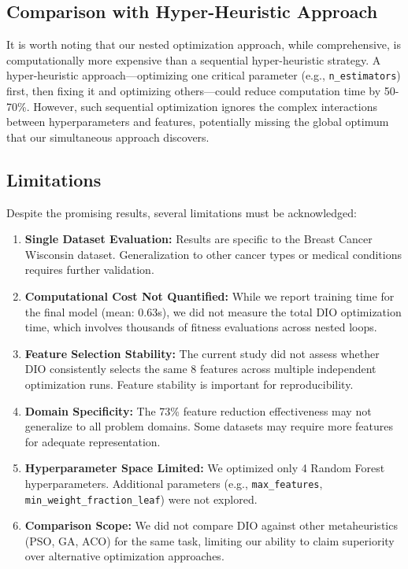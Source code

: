\documentclass[12pt, a4paper]{article}
\begin{document}
\subsection{Comparison with Hyper-Heuristic Approach}
It is worth noting that our nested optimization approach, while comprehensive, is computationally more expensive than a sequential hyper-heuristic strategy. A hyper-heuristic approach—optimizing one critical parameter (e.g., \texttt{n\_estimators}) first, then fixing it and optimizing others—could reduce computation time by 50-70\%. However, such sequential optimization ignores the complex interactions between hyperparameters and features, potentially missing the global optimum that our simultaneous approach discovers.

\subsection{Limitations}
Despite the promising results, several limitations must be acknowledged:
\begin{enumerate}
    \item \textbf{Single Dataset Evaluation:} Results are specific to the Breast Cancer Wisconsin dataset. Generalization to other cancer types or medical conditions requires further validation.
    \item \textbf{Computational Cost Not Quantified:} While we report training time for the final model (mean: 0.63s), we did not measure the total DIO optimization time, which involves thousands of fitness evaluations across nested loops.
    \item \textbf{Feature Selection Stability:} The current study did not assess whether DIO consistently selects the same 8 features across multiple independent optimization runs. Feature stability is important for reproducibility.
    \item \textbf{Domain Specificity:} The 73\% feature reduction effectiveness may not generalize to all problem domains. Some datasets may require more features for adequate representation.
    \item \textbf{Hyperparameter Space Limited:} We optimized only 4 Random Forest hyperparameters. Additional parameters (e.g., \texttt{max\_features}, \texttt{min\_weight\_fraction\_leaf}) were not explored.
    \item \textbf{Comparison Scope:} We did not compare DIO against other metaheuristics (PSO, GA, ACO) for the same task, limiting our ability to claim superiority over alternative optimization approaches.
\end{enumerate}
\end{document}
